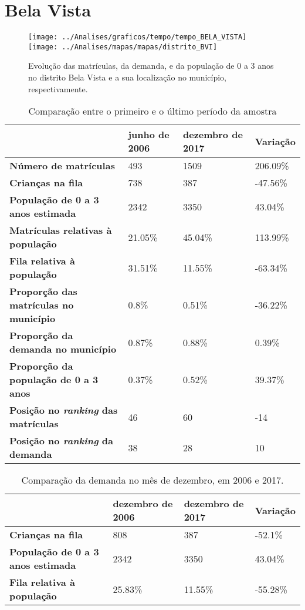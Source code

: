 \section{Bela Vista}
\begin{figure}[H]
	\centering
	\texttt{[image: ../Analises/graficos/tempo/tempo\_BELA\_VISTA]}
	\texttt{[image: ../Analises/mapas/mapas/distrito\_BVI]}
	\caption{Evolução das matrículas, da demanda, e da população de 0 a 3 anos no distrito Bela Vista e a sua localização no município, respectivamente.}
\end{figure}
\begin{table}[H]
	\begin{tabular}{|l|l|l|l|}
		\hline
		\textbf{}                                      & \textbf{junho de 2006}       & \textbf{dezembro de 2017}    & \textbf{Variação} \\ \hline
		\textbf{Número de matrículas}                  & 493 & 1509 & 206.09\% \\ \hline
		\textbf{Crianças na fila}                      & 738 & 387 & -47.56\% \\ \hline
		\textbf{População de 0 a 3 anos estimada}      & 2342 & 3350 & 43.04\% \\ \hline
		\textbf{Matrículas relativas à população}      & 21.05\% & 45.04\% & 113.99\% \\ \hline
		\textbf{Fila relativa à população}             & 31.51\% & 11.55\% & -63.34\% \\ \hline
		\textbf{Proporção das matrículas no município} & 0.8\% & 0.51\% & -36.22\% \\ \hline
		\textbf{Proporção da demanda no município}     & 0.87\% & 0.88\% & 0.39\% \\ \hline
		\textbf{Proporção da população de 0 a 3 anos}  & 0.37\% & 0.52\% & 39.37\% \\ \hline
		\textbf{Posição no \textit{ranking} das matrículas}     & 46 & 60 & -14 \\ \hline
		\textbf{Posição no \textit{ranking} da demanda}         & 38 & 28 & 10 \\ \hline
	\end{tabular}
	\caption{Comparação entre o primeiro e o último período da amostra}
\end{table}
\begin{table}[H]
	\begin{tabular}{|l|l|l|l|}
		\hline
		\textbf{}                                 & \textbf{dezembro de 2006} & \textbf{dezembro de 2017} & \textbf{Variação} \\ \hline
		\textbf{Crianças na fila}                      & 808 & 387 & -52.1\% \\ \hline
		\textbf{População de 0 a 3 anos estimada}      & 2342 & 3350 & 43.04\% \\ \hline
		\textbf{Fila relativa à população}             & 25.83\% & 11.55\% & -55.28\% \\ \hline
	\end{tabular}
	\caption{Comparação da demanda no mês de dezembro, em 2006 e 2017.}
\end{table}
